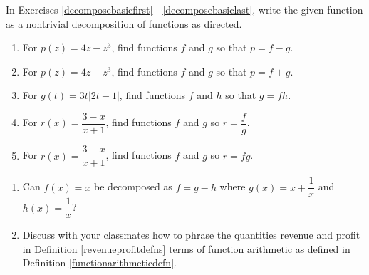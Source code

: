 In Exercises \ref{decomposebasicfirst} - \ref{decomposebasiclast}, write the given function as a nontrivial decomposition of functions as directed.

\begin{enumerate}
\setcounter{enumi}{\value{HW}}

\item  For $p(z) = 4z-z^3$, find functions $f$ and $g$ so that $p=f-g$. \label{decomposebasicfirst}
\item  For $p(z) = 4z-z^3$, find functions $f$ and $g$ so that $p=f+g$.
\item  For $g(t) = 3t|2t-1|$, find functions $f$ and $h$  so that $g = fh$.
\item  For $r(x) = \dfrac{3-x}{x+1}$, find functions $f$ and $g$ so $r = \dfrac{f}{g}$.
\item  For $r(x) = \dfrac{3-x}{x+1}$, find functions $f$ and $g$ so $r = fg$. \label{decomposebasiclast}

\setcounter{HW}{\value{enumi}}
\end{enumerate}

\begin{enumerate}
\setcounter{enumi}{\value{HW}}

\item    Can $f(x) = x$ be decomposed as $f = g-h$ where $g(x) = x+\dfrac{1}{x}$ and $h(x) = \dfrac{1}{x}$?

\item   Discuss with your classmates how to phrase the quantities revenue and profit in Definition \ref{revenueprofitdefns} terms of function arithmetic as defined in Definition \ref{functionarithmeticdefn}.
 
\setcounter{HW}{\value{enumi}}
\end{enumerate}



